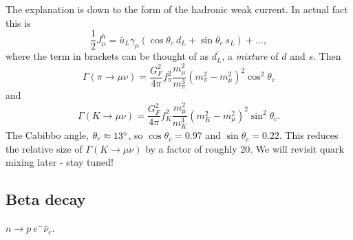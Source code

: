 \documentclass[a4paper,12pt]{article}
\begin{document}
The explanation is down to the form of the hadronic weak current. In actual fact this is
\begin{equation}
 \frac{1}{2}J_\mu^h = \bar{u}_L\gamma_\mu(\cos\theta_c\ d_L + \sin\theta_c\ s_L) + ..., 
\end{equation}
where the term in brackets can be thought of as $d_L^\prime$, a \textit{mixture} of $d$ and $s$. Then 
\begin{equation}
    \Gamma(\pi \to \mu\nu) = \frac{G_F^2}{4\pi} f_\pi^2 \frac{m_\mu^2}{m_\pi^3}(m_\pi^2 - m_\mu^2)^2 \cos^2\theta_c
\end{equation} 
and
\begin{equation}
    \Gamma(K \to \mu\nu) = \frac{G_F^2}{4\pi} f_K^2 \frac{m_\mu^2}{m_K^3}(m_K^2 - m_\mu^2)^2 \sin^2\theta_c.
\end{equation} 
The Cabibbo angle, $\theta_c \approx 13\degree$, so $\cos\theta_c = 0.97$ and $\sin\theta_c = 0.22$. This reduces the relative size of $\Gamma(K \to \mu\nu)$ by a factor of roughly 20. We will revisit quark mixing later - stay tuned!
%
\subsection{Beta decay}
$n \to p\ e^- \bar{\nu}_e$.
\newline
\end{document}
